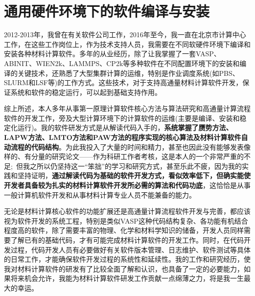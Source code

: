 \documentclass{article}      %
\begin{document}
\section{通用硬件环境下的软件编译与安装}
2012-2013年，我曾在有关软件公司工作，2016年至今，我一直在北京市计算中心工作，在这些工作岗位上，作为技术支持人员，我需要在不同软硬件环境下编译和安装各种材料计算软件。多年的从业经历，除了让我掌握了一套\textrm{VASP}、\textrm{ABINIT}、\textrm{WIEN2k}、\textrm{LAMMPS}、\textrm{CP2k}等多种软件在不同配置环境下的安装和编译的关键技术，还熟悉了大型集群计算的运维，特别是作业调度系统(如\textrm{PBS}、\textrm{SLURM}和\textrm{LSF}等)的工作方式。这些技术，对于支持高通量材料计算软件开发，保证系统和软件的稳定运行，可以起到基础支持作用。

\vskip 15pt
综上所述，本人多年从事第一原理计算软件核心方法与算法研究和高通量计算流程软件的开发工作，旁及大型计算环境下的计算软件的运维(主要是编译、安装和稳定化运行)。我的软件研发方式是从解读代码入手的，\textbf{系统掌握了赝势方法、\textrm{LAPW}方法、\textrm{LMTO}方法和\textrm{PAW}方法的程序实现的核心算法及材料计算软件自动流程的代码结构}。为此我投入了大量的时间和精力，甚至也因此没有能够发表像样的、有分量的研究论文——作为科研工作者考核，这是本人的一个非常严重的不足;~但我之所以仍坚持这一“笨拙”的学习和研究方式，甚至乐此不疲，因为我的实践和坚持证明，\textbf{通过解读代码为基础的软件开发方式，看似效率低下，但确实能使开发者具备较为扎实的材料计算软件开发所必需的算法和代码功底}，这恰恰是从事一般计算机软件开发和从事材料计算专业人员不能兼备的能力。

无论是材料计算核心软件的功能扩展还是高通量计算流程软件开发与完善，都应该视为软件开发的系统工程，特别是类似\textrm{VASP}这种代码结构复杂、各功能有机结合程度高的软件，除了需要丰富的物理、化学和材料学知识的储备，开发人员同样需要了解已有的基础代码，才有可能完成材料计算软件的开发工作。同时，在代码开发过程，代码开发人员有必要做好有关软件版本管理、日志维护、软件测试等具体的日常工作，才能确保软件开发过程的系统性和延续性。我的工作和研究经历，使我对材料计算软件的研发有了比较全面了解和认识，也具备了一定的必要能力，如果将来机会允许，我能为材料计算软件研发工作贡献一点绵薄之力，将是我一生最大的幸运。
\end{document}
